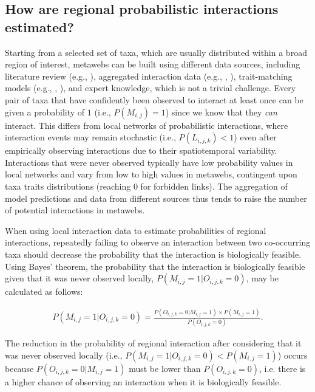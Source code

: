 \subsection{How are regional probabilistic interactions estimated?}

Starting from a selected set of taxa, which are usually distributed within a
broad region of interest, metawebs can be built using different data sources,
including literature review (e.g., \cite{Maiorano2020Tetraeu}), aggregated
interaction data (e.g., \cite{Gravel2019Bringing},
\cite{Saravia2022Ecological}), trait-matching models (e.g.,
\cite{Shaw2024Framework}, \cite{Strydom2022Food}), and expert knowledge, which
is not a trivial challenge. Every pair of taxa that have confidently been
observed to interact at least once can be given a probability of $1$ (i.e.,
$P(M_{i, j}) = 1$) since we know that they \textit{can} interact. This differs
from local networks of probabilistic interactions, where interaction events may
remain stochastic (i.e., $P(L_{i, j, k}) < 1$) even after empirically observing
interactions due to their spatiotemporal variability. Interactions that were
never observed typically have low probability values in local networks and vary
from low to high values in metawebs, contingent upon taxa traits distributions
(reaching $0$ for forbidden links). The aggregation of model predictions and
data from different sources thus tends to raise the number of potential
interactions in metawebs.

When using local interaction data to estimate probabilities of regional
interactions, repeatedly failing to observe an interaction between two
co-occurring taxa should decrease the probability that the interaction is
biologically feasible. Using Bayes' theorem, the probability that the
interaction is biologically feasible given that it was never observed locally,
$P(M_{i, j} = 1 | O_{i, j, k} = 0)$, may be calculated as follows: 

\begin{eqnarray}
  \label{eq:emp_sampling}
  P(M_{i, j} = 1 | O_{i, j, k} = 0) = \frac{P(O_{i, j, k} = 0 |M_{i, j} = 1)
\times P(M_{i, j} = 1)}{P(O_{i, j, k} = 0)}.
\end{eqnarray}

The reduction in the probability of regional interaction after considering that
it was never observed locally (i.e., $P(M_{i, j} = 1 | O_{i, j, k} = 0) <
P(M_{i, j} = 1)$) occurs because $P(O_{i, j, k} = 0 | M_{i, j} = 1)$ must be
lower than $P(O_{i, j, k} = 0)$, i.e. there is a higher chance of observing an
interaction when it is biologically feasible. 

